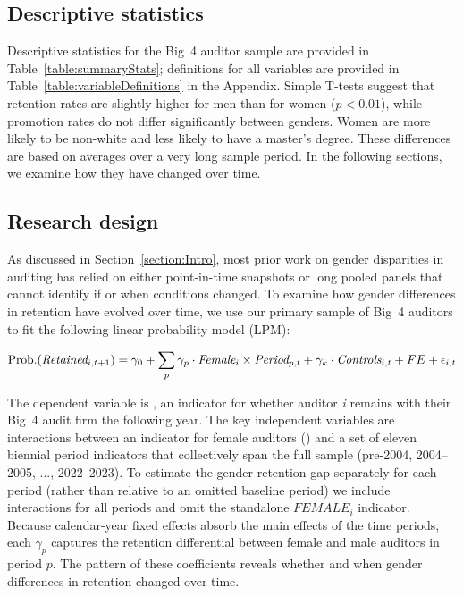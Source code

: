 \documentclass[11pt]{article}
\begin{document}
    \subsection{Descriptive statistics}\label{section:descriptiveStatistics}
        Descriptive statistics for the Big~4 auditor sample are provided in Table~\ref{table:summaryStats}; definitions for all variables are provided in Table~\ref{table:variableDefinitions} in the Appendix. Simple T-tests suggest that retention rates are slightly higher for men than for women ($p<0.01$), while promotion rates do not differ significantly between genders. Women are more likely to be non-white and less likely to have a master's degree. These differences are based on averages over a very long sample period. In the following sections, we examine how they have changed over time.
    \subsection{Research design}\label{section:byperiod}
        As discussed in Section~\ref{section:Intro}, most prior work on gender disparities in auditing has relied on either point-in-time snapshots or long pooled panels that cannot identify if or when conditions changed. To examine how gender differences in retention have evolved over time, we use our primary sample of Big~4 auditors to fit the following linear probability model (LPM):

        \vspace{-2ex}
        \begin{align}\label{eq:primaryModel}
            \mathrm{Prob.}(\textit{Retained}_{i,t+1})= \gamma_0 + \sum_{p} \gamma_p \cdot \textit{Female}_{i} \times \textit{Period}_{p,t} + \gamma_k \cdot \textit{Controls}_{i,t} + FE + \epsilon_{i,t}
        \end{align}

        The dependent variable is \RETAINED, an indicator for whether auditor \textit{i} remains with their Big~4 audit firm the following year. The key independent variables are interactions between an indicator for female auditors (\FEMALE) and a set of eleven biennial period indicators that collectively span the full sample (pre-2004, 2004--2005, ..., 2022--2023). To estimate the gender retention gap separately for each period (rather than relative to an omitted baseline period) we include interactions for all periods and omit the standalone \(FEMALE_i\) indicator. Because calendar-year fixed effects absorb the main effects of the time periods, each $\gamma_p$ captures the retention differential between female and male auditors in period $p$.  The pattern of these coefficients reveals whether and when gender differences in retention changed over time.
\end{document}
